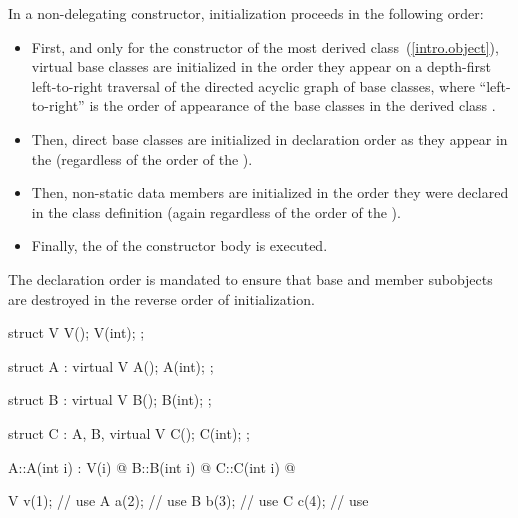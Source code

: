\pnum
In a non-delegating constructor, initialization
proceeds in the following order:
\begin{itemize}
\item
{}%
First, and only for the constructor of the most derived class~(\ref{intro.object}),
virtual base classes are initialized in the order they appear on a
depth-first left-to-right traversal of the directed acyclic graph of
base classes,
where ``left-to-right'' is the order of appearance of the base classes
in the derived class
.
\item
{}%
Then, direct base classes are initialized in declaration order
as they appear in the
(regardless of the order of the
).
\item
{}%
Then, non-static data members are initialized in the order
they were declared in the class definition
(again regardless of the order of the
).
\item
Finally, the  of the constructor
body  is executed.
\end{itemize}

\begin{note}
The declaration order is mandated to ensure that base and member
subobjects are destroyed in the reverse order of initialization.
\end{note}

\pnum
\begin{example}
\begin{codeblock}
struct V {
  V();
  V(int);
};

struct A : virtual V {
  A();
  A(int);
};

struct B : virtual V {
  B();
  B(int);
};

struct C : A, B, virtual V {
  C();
  C(int);
};

A::A(int i) : V(i) { @\commentellip@ }
B::B(int i) { @\commentellip@ }
C::C(int i) { @\commentellip@ }

V v(1);             // use 
A a(2);             // use 
B b(3);             // use 
C c(4);             // use 
\end{codeblock}
\end{example}


